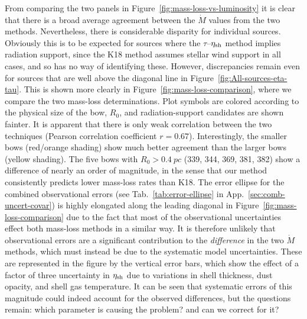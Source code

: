 From comparing the two panels in
Figure~\ref{fig:mass-loss-vs-luminosity} it is clear that there is a
broad average agreement between the \(\dot{M}\) values from the two
methods.  Nevertheless, there is considerable disparity for individual
sources.  Obviously this is to be expected for sources where the
\(\tau\)--\(\eta_{\text{sh}}\) method implies radiation support, since the
K18 method assumes stellar wind support in all cases, and so has no
way of identifying these.  However, discrepancies remain even for
sources that are well above the diagonal line in
Figure~\ref{fig:All-sources-eta-tau}.  This is shown more clearly in
Figure~\ref{fig:mass-loss-comparison}, where we compare the two
mass-loss determinations. Plot symbols are colored according to the
physical size of the bow, \(R_0\), and radiation-support candidates
are shown fainter.  It is apparent that there is only weak correlation
between the two techniques (Pearson correlation coefficient
\(r = 0.67\)).  Interestingly, the smaller bows (red/orange shading)
show much better agreement than the larger bows (yellow shading).  The
five bows with \(R_0 > \SI{0.4}{pc}\) (339, 344, 369, 381, 382) show a
difference of nearly an order of magnitude, in the sense that our
method consistently predicts lower mass-loss rates than K18.  The
error ellipse for the combined observational errors (see
Tab.~\ref{tab:error-ellipse} in App.~\ref{sec:comb-uncert-covar}) is
highly elongated along the leading diagonal in
Figure~\ref{fig:mass-loss-comparison} due to the fact that most of the
observational uncertainties effect both mass-loss methods in a similar
way.  It is therefore unlikely that observational errors are a
significant contribution to the \textit{difference} in the two
\(\dot M\) methods, which must instead be due to the systematic model
uncertainties.  These are represented in the figure by the vertical
error bars, which show the effect of a factor of three uncertainty in
\(\eta_{\text{sh}}\) due to variations in shell thickness, dust opacity, and
shell gas temperature.  It can be seen that systematic errors of this
magnitude could indeed account for the observed differences, but the
questions remain: which parameter is causing the problem? and can we
correct for it?

